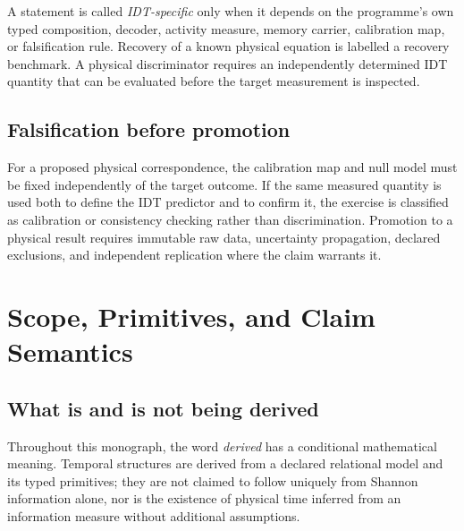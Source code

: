 A statement is called \emph{IDT-specific} only when it depends on the programme's own typed composition, decoder, activity measure, memory carrier, calibration map, or falsification rule. Recovery of a known physical equation is labelled a recovery benchmark. A physical discriminator requires an independently determined IDT quantity that can be evaluated before the target measurement is inspected.

\section*{Falsification before promotion}

For a proposed physical correspondence, the calibration map and null model must be fixed independently of the target outcome. If the same measured quantity is used both to define the IDT predictor and to confirm it, the exercise is classified as calibration or consistency checking rather than discrimination. Promotion to a physical result requires immutable raw data, uncertainty propagation, declared exclusions, and independent replication where the claim warrants it.


\chapter*{Scope, Primitives, and Claim Semantics}

\section*{What is and is not being derived}

Throughout this monograph, the word \emph{derived} has a conditional mathematical meaning. Temporal structures are derived from a declared relational model and its typed primitives; they are not claimed to follow uniquely from Shannon information alone, nor is the existence of physical time inferred from an information measure without additional assumptions.

